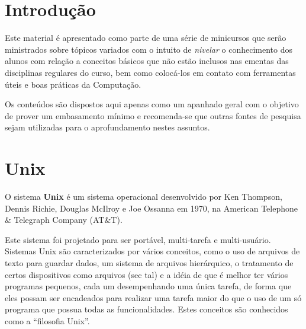 \documentclass{handout_utfpr}
\begin{document}
\maketitle
\section{Introdução}

Este material é apresentado como parte de uma série de minicursos que serão ministrados sobre tópicos variados com o intuito de \textit{nivelar} o conhecimento dos alunos com relação a conceitos básicos que não estão inclusos nas ementas das disciplinas regulares do curso, bem como colocá-los em contato com ferramentas úteis e boas práticas da Computação.

Os conteúdos são dispostos aqui apenas como um apanhado geral com o objetivo de prover um embasamento mínimo e recomenda-se que outras fontes de pesquisa sejam utilizadas para o aprofundamento nestes assuntos.

\section{Unix}
O sistema \textbf{Unix} é um sistema operacional desenvolvido por Ken Thompson, Dennis Richie, Douglas McIlroy e Joe Ossanna em 1970, na American Telephone \& Telegraph Company (AT\&T).

Este sistema foi projetado para ser portável, multi-tarefa e multi-usuário. Sistemas Unix são caracterizados por vários conceitos, como o uso de arquivos de texto para guardar dados, um sistema de arquivos hierárquico, o tratamento de certos dispositivos como arquivos (sec tal) e a idéia de que é melhor ter vários programas pequenos, cada um desempenhando uma única tarefa, de forma que eles possam ser encadeados para realizar uma tarefa maior do que o uso de um só programa que possua todas as funcionalidades. Estes conceitos são conhecidos como a ``filosofia Unix''.


\end{document}
